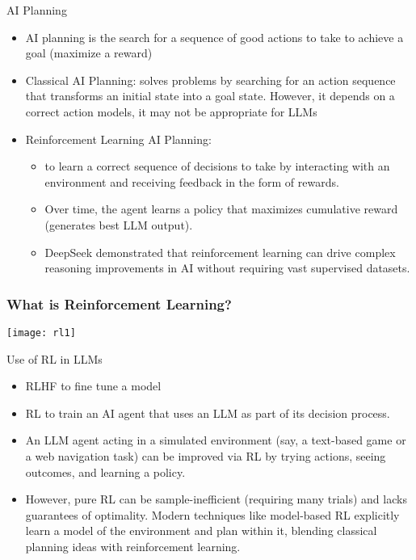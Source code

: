 \begin{frame}[fragile]{AI Planning}


    \begin{itemize}
        \item AI planning is the search for a sequence of good actions to take to 
achieve a goal (maximize a reward)
\item  Classical AI Planning: solves problems by searching for an action sequence that 
transforms an initial state into a goal state. However, it depends on a correct action models, 
it may not be appropriate for LLMs
\item Reinforcement Learning AI Planning: 
	    \begin{itemize}
        \item to learn a correct sequence of decisions to 
take by interacting with an environment and receiving feedback in the 
form of rewards. 
		\item Over time, the agent learns a policy that maximizes cumulative reward 
(generates best LLM output).  
		\item DeepSeek demonstrated that reinforcement learning can drive complex reasoning improvements in AI without requiring vast supervised datasets.
		\end{itemize}

    \end{itemize}
\end{frame}

\begin{frame}[fragile]\frametitle{What is Reinforcement Learning?}
		\begin{center}
		\texttt{[image: rl1]}
		\end{center}

\end{frame}


\begin{frame}[fragile]{Use of RL in LLMs}


    \begin{itemize}
        \item  RLHF to fine tune a model
		\item RL to train an AI agent that uses an LLM as part of its decision process.
		\item An LLM agent acting in a simulated environment (say, a text-based 
game or a web navigation task) can be improved via RL by trying actions, 
seeing outcomes, and learning a policy. 
		\item However, pure RL can be sample-inefficient (requiring many trials) and 
lacks guarantees of optimality. Modern techniques like model-based RL 
explicitly learn a model of the environment and plan within it, blending 
classical planning ideas with reinforcement learning.
    \end{itemize}
\end{frame}


